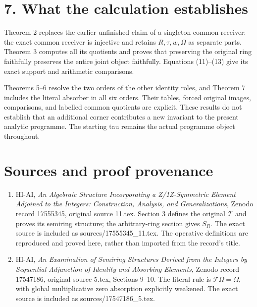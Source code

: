 \documentclass[
]{article}
\providecommand{\tightlist}{%
  \setlength{\itemsep}{0pt}\setlength{\parskip}{0pt}}
\begin{document}
\section{7. What the calculation
establishes}\label{what-the-calculation-establishes}

Theorem 2 replaces the earlier unfinished claim of a singleton common
receiver: the exact common receiver is injective and retains
\(R,\tau,w,\Omega\) as separate parts. Theorem 3 computes all its
quotients and proves that preserving the original ring faithfully
preserves the entire joint object faithfully. Equations (11)--(13) give
its exact support and arithmetic comparisons.

Theorems 5--6 resolve the two orders of the other identity roles, and
Theorem 7 includes the literal absorber in all six orders. Their tables,
forced original images, comparisons, and labelled common quotients are
explicit. These results do not establish that an additional corner
contributes a new invariant to the present analytic programme. The
starting tau remains the actual programme object throughout.

\section{Sources and proof
provenance}\label{sources-and-proof-provenance}

\begin{enumerate}
\def\labelenumi{\arabic{enumi}.}
\tightlist
\item
  HI-AI, \emph{An Algebraic Structure Incorporating a Z/1Z-Symmetric
  Element Adjoined to the Integers: Construction, Analysis, and
  Generalizations}, Zenodo record 17555345, original source 11.tex.
  Section 3 defines the original \(\mathcal T\) and proves its semiring
  structure; the arbitrary-ring section gives \(S_R\). The exact source
  is included as sources/17555345\_11.tex. The operative definitions are
  reproduced and proved here, rather than imported from the record's
  title.
\item
  HI-AI, \emph{An Examination of Semiring Structures Derived from the
  Integers by Sequential Adjunction of Identity and Absorbing Elements},
  Zenodo record 17547186, original source 5.tex, Sections 9--10. The
  literal rule is \(\mathcal T\Omega=\Omega\), with global
  multiplicative zero absorption explicitly weakened. The exact source
  is included as sources/17547186\_5.tex.
\end{enumerate}
\end{document}
